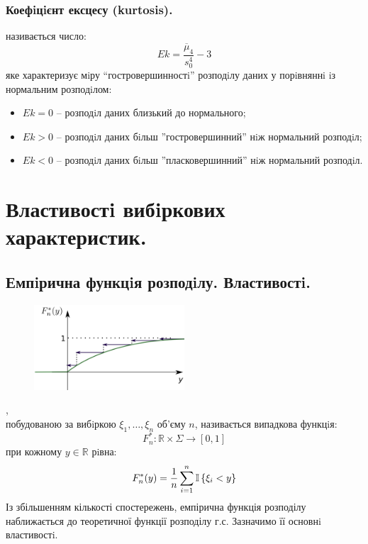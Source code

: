 \subsubsection{Коефiцiєнт ексцесу (kurtosis).}
 називається число:
$$
Ek = \frac{\overline{\mu}_4}{s_0^4} - 3
$$
яке характеризує мiру ``гостровершинностi'' розподiлу даних у порiвняннi iз нормальним
розподiлом:
\begin{itemize}
\item $Ek = 0$ – розподiл даних близький до нормального;
\item $Ek > 0$ – розподiл даних бiльш ”гостровершинний” нiж нормальний розподiл;
\item $Ek < 0$ – розподiл даних бiльш ”пласковершинний” нiж нормальний розподiл.
\end{itemize}
\section{Властивостi вибiркових характеристик.}
\subsection{Емпiрична функцiя розподiлу. Властивостi.}
\begin{figure}
\vspace*{-2em}
\centering
\includegraphics[width=0.5\textwidth]{assets/lectures_part_5-c8ce8645.png}
\end{figure}
, \\ побудованою за вибiркою $\xi_1, \dots , \xi_n$ об’єму $n$, називається випадкова
функцiя: \\$$F_n^* : \mathbb{R} \times \Sigma \to [0,1]$$ при кожному $y \in \mathbb{R}$ рiвна:
$$
F_n^* (y) = \frac{1}{n}  \sum\limits_{i = 1}^{ n}{ \mathbb{I} \left\lbrace \xi_i < y \right\rbrace}
$$
Із збільшенням кількості спостережень, емпірична функція розподілу наближається до теоретичної функції розподілу г.с. Зазначимо її основнi властивостi.

